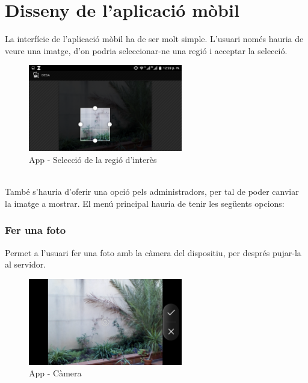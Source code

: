 \section{Disseny de l'aplicació mòbil}
	La interfície de l'aplicació mòbil ha de ser molt simple. L'usuari només hauria de veure una imatge, d'on podria seleccionar-ne una regió i acceptar la selecció.\\
	\begin{figure}[H]
			\centering
			\includegraphics[width=0.6\textwidth]{images/crop}
			\caption{App - Selecció de la regió d'interès}
		\end{figure}
	\noindent
	\\{}
	També s'hauria d'oferir una opció pels administradors, per tal de poder canviar la imatge a mostrar. El menú principal hauria de tenir les següents opcions:
	\subsubsection{Fer una foto}
		Permet a l'usuari fer una foto amb la càmera del dispositiu, per després pujar-la al servidor.\\
		\begin{figure}[H]
			\centering
			\includegraphics[width=0.6\textwidth]{images/cam}
			\caption{App - Càmera}
		\end{figure}
